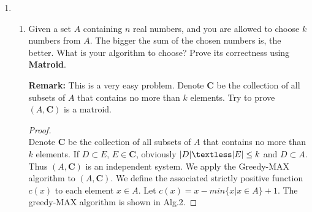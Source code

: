 \documentclass[12pt,a4paper]{article}
\theoremstyle{definition}
\begin{document}
\begin{enumerate}
\begin{proof}
\begin{minipage}[t]{0.8\textwidth}
\begin{algorithm}[H]
     	\end{algorithm}
     \end{minipage}
     
     It is obvious that the time complexity of this algorithm is O(n).
     
     Correctness:
     
     We can prove the correctness of the greedy algorithm by contradiction.
     
     Assume that greedy algorithm does not provide the optimal solution.
     
     Let $i_1,i_2,...,i_k(i_1\textless i_2\textless...\textless i_k)$ be the set of positions selected by greedy algorithm.
     
     Let $j_1,j_2,...,j_m(j_1\textless j_2\textless...\textless j_m)$ be the set of positions in an optimal solution with $i_1=j_1, i_2=j_2,...,i_r=j_r$ for the largest possible value of $r$. Then we know position 1 to $i_r+1$ is protected.
     
     Now consider the $(r+1)^{th}$ hydrant. Suppose the next closest to $i_r$ house without protection is at position $x$. To protect the house at position $x$, we can place the hydrant at position $x-1$, $x$ or $x+1$.
     
     In our greedy algorithm, we will always place the hydrant at position $x+1$. If the OPT choose the position $x$ or $x-1$, there will be unnecessary waste of space. So the greedy algorithm is optimal.
     
     \end{proof}

    \item
\begin{enumerate}
\item
    Given a set $A$ containing $n$ real numbers, and you are allowed to choose $k$ numbers from $A$. The bigger the sum of the chosen numbers is, the better. What is your algorithm to choose? Prove its correctness using \textbf{Matroid}.\par
\textbf{Remark:} This is a very easy problem. Denote $\mathbf{C}$ be the collection of all subsets of $A$ that contains no more than $k$ elements. Try to prove $(A,\mathbf{C})$ is a matroid.\par
    \begin{proof}
    	~\\
        Denote $\mathbf{C}$ be the collection of all subsets of $A$ that contains no more than $k$ elements. If $D\subset E$, $E\in\mathbf{C}$, obviously $|D|\textless|E|\le k$ and $D\subset A$. Thus  $(A,\mathbf{C})$ is an independent system. We apply the Greedy-MAX algorithm to $(A,\mathbf{C})$. We define the associated strictly positive function $c(x)$ to each element $x\in A$. Let $c(x)=x-min\{x|x\in A\}+1$. The greedy-MAX algorithm is shown in Alg.2.
        

\end{proof}
\end{enumerate}
\end{enumerate}
\end{document}
